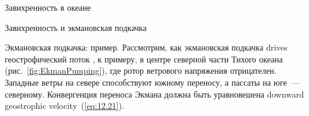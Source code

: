 \begin{chapter}{Завихренность в океане}
\begin{section}{Завихренность и экмановская подкачка}
\begin{paragraph}{Экмановская подкачка: пример.}
Рассмотрим, как экмановская подкачка 
drives геострофический поток%
,
к примеру, в центре северной части Тихого океана (рис.~\ref{fig:EkmanPumping}),
где ротор ветрового напряжения отрицателен. 
Западные ветры на севере способствуют
южному переносу, 
а пассаты на юге~--- северному. 
Конвергенция переноса Экмана должна быть уравновешена
downward geostrophic velocity~(\ref{eq:12.21}).
%


\end{paragraph}
\end{section}
\end{chapter}
